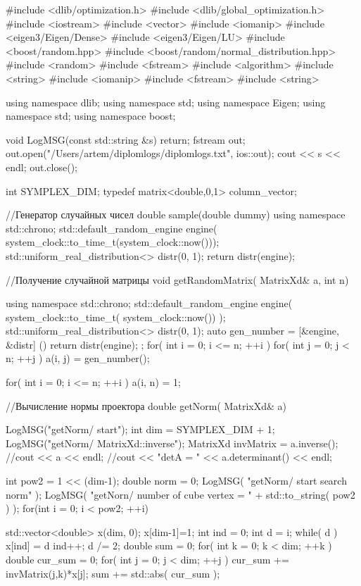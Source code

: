 \documentclass[12pt, a4paper]{extarticle}
\begin{document}
\begin{listing}[1]{1}
#include <dlib/optimization.h>
#include <dlib/global_optimization.h>
#include <iostream>
#include <vector>
#include <iomanip>
#include <eigen3/Eigen/Dense>
#include <eigen3/Eigen/LU>
#include <boost/random.hpp>
#include <boost/random/normal_distribution.hpp>
#include <random>
#include <fstream>
#include <algorithm>
#include <string>
#include <iomanip>
#include <fstream>
#include <string>

using namespace dlib;
using namespace std;
using namespace Eigen;
using namespace std;
using namespace boost;

void LogMSG(const std::string &s)
{
	return;
	fstream out;
	out.open("/Users/artem/diplomlogs/diplomlogs.txt", ios::out);
	cout << s << endl;
	out.close();
}


int SYMPLEX_DIM;
typedef matrix<double,0,1> column_vector;

//Генератор случайных чисел
double sample(double dummy)
{
	using namespace std::chrono;
	std::default_random_engine engine(
	system_clock::to_time_t(system_clock::now()));
	std::uniform_real_distribution<> distr(0, 1);
	return distr(engine);
}

//Получение случайной матрицы
void getRandomMatrix( MatrixXd& a, int n)
{
	using namespace std::chrono;
	std::default_random_engine engine(
	system_clock::to_time_t( system_clock::now()) );
	std::uniform_real_distribution<> distr(0, 1);
	auto gen_number = [&engine, &distr] () { return distr(engine); };
	for( int i = 0; i <= n; ++i )
	{
		for( int j = 0; j < n; ++j )
		{
			a(i, j) = gen_number();
		}
	}
	
	for( int i = 0; i <= n; ++i )
	{
		a(i, n) = 1;
	}
	
}


//Вычисление нормы проектора
double getNorm( MatrixXd& a)
{
	LogMSG("getNorm/ start");
	int dim = SYMPLEX_DIM + 1;
	LogMSG("getNorm/ MatrixXd::inverse");
	MatrixXd invMatrix = a.inverse();
	//cout << a << endl;
	//cout << "detA = " << a.determinant() << endl;
	
	int pow2 = 1 << (dim-1);
	double norm = 0;
	LogMSG( "getNorm/ start search norm" );
	LogMSG( "getNorn/ number of cube vertex = " + std::to_string( pow2 ) );
	for(int i = 0; i < pow2; ++i)
	{
		std::vector<double> x(dim, 0);
		x[dim-1]=1;
		int ind = 0;
		int d = i;
		while( d )
		{
			x[ind] = d %
			ind++;
			d /= 2;
		}
		double sum = 0;
		for( int k = 0; k < dim; ++k )
		{
			double cur_sum = 0;
			for( int j = 0; j < dim; ++j )
			{
				cur_sum += invMatrix(j,k)*x[j];
			}
			sum += std::abs( cur_sum );
		}
		
}}
\end{listing}
\end{document}
